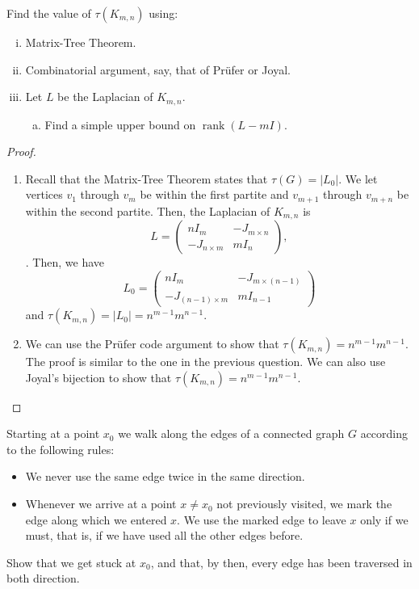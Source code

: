 \documentclass[11pt]{article}
\begin{document}
\begin{quest}
    Find the value of $\tau(K_{m,n})$ using:
    \begin{enumerate}[(i)]
        \item Matrix-Tree Theorem.
        \item Combinatorial argument, say, that of Prüfer or Joyal.
        \item Let $L$ be the Laplacian of $K_{m,n}$.
            \begin{enumerate}[(a)]
                \item Find a simple upper bound on $\mathop{\mathrm{rank}}(L-mI)$.
            \end{enumerate}
    \end{enumerate}
\end{quest}
\begin{proof}
    \begin{enumerate}
        \item Recall that the Matrix-Tree Theorem states that $\tau(G) = |L_0|$. We let vertices $v_1$ through $v_m$ be within the first partite and $v_{m+1}$ through $v_{m+n}$ be within the second partite. Then, the Laplacian of $K_{m,n}$ is \[L=\begin{pmatrix}nI_m&-J_{m \times n}\\-J_{n \times m}&mI_n\end{pmatrix},\]. Then, we have
        \[
            L_0=\begin{pmatrix}nI_m&-J_{m \times (n-1)}\\-J_{(n-1) \times m}&mI_{n-1}\end{pmatrix}
        \]
        and $\tau(K_{m,n})=|L_0|=n^{m-1}m^{n-1}$.

        \item We can use the Prüfer code argument to show that $\tau(K_{m,n})=n^{m-1}m^{n-1}$. The proof is similar to the one in the previous question. We can also use Joyal's bijection to show that $\tau(K_{m,n})=n^{m-1}m^{n-1}$.
    \end{enumerate}
\end{proof}
\setcounter{problem}{3}
\begin{quest}
    Starting at a point $x_0$ we walk along the edges of a connected graph $G$ according to the following rules:
    \begin{itemize}
        \item We never use the same edge twice in the same direction.
        \item Whenever we arrive at a point $x\neq x_0$ not previously visited, we mark the edge along which we entered $x$. We use the marked edge to leave $x$ only if we must, that is, if we have used all the other edges before.
    \end{itemize}
    Show that we get stuck at $x_0$, and that, by then, every edge has been traversed in both direction.
\end{quest}
\end{document}
